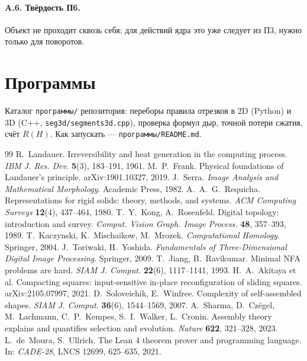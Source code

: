 \documentclass[11pt,a4paper]{article}
\theoremstyle{plain}
\theoremstyle{definition}
\theoremstyle{remark}
\begin{document}
\paragraph{A.6. Твёрдость П6.} Объект не проходит сквозь себя; для действий ядра это уже следует из П3, нужно только для поворотов.

\section{Программы}
Каталог \texttt{программы/} репозитория: переборы правила отрезков в 2D (Python) и 3D (C++, \texttt{seg3d/segments3d.cpp}), проверка формул дыр, точной потери сжатия, счёт $R(H)$. Как запускать — \texttt{программы/README.md}.

\begin{thebibliography}{99}
 R.~Landauer. Irreversibility and heat generation in the computing process. \emph{IBM J. Res. Dev.} \textbf{5}(3), 183--191, 1961.
 M.~P.~Frank. Physical foundations of Landauer's principle. arXiv:1901.10327, 2019.
 J.~Serra. \emph{Image Analysis and Mathematical Morphology}. Academic Press, 1982.
 A.~A.~G.~Requicha. Representations for rigid solids: theory, methods, and systems. \emph{ACM Computing Surveys} \textbf{12}(4), 437--464, 1980.
 T.~Y.~Kong, A.~Rosenfeld. Digital topology: introduction and survey. \emph{Comput. Vision Graph. Image Process.} \textbf{48}, 357--393, 1989.
 T.~Kaczynski, K.~Mischaikow, M.~Mrozek. \emph{Computational Homology}. Springer, 2004.
 J.~Toriwaki, H.~Yoshida. \emph{Fundamentals of Three-Dimensional Digital Image Processing}. Springer, 2009.
 T.~Jiang, B.~Ravikumar. Minimal NFA problems are hard. \emph{SIAM J. Comput.} \textbf{22}(6), 1117--1141, 1993.
 H.~A.~Akitaya et al. Compacting squares: input-sensitive in-place reconfiguration of sliding squares. arXiv:2105.07997, 2021.
 D.~Soloveichik, E.~Winfree. Complexity of self-assembled shapes. \emph{SIAM J. Comput.} \textbf{36}(6), 1544--1569, 2007.
 A.~Sharma, D.~Czégel, M.~Lachmann, C.~P.~Kempes, S.~I.~Walker, L.~Cronin. Assembly theory explains and quantifies selection and evolution. \emph{Nature} \textbf{622}, 321--328, 2023.
 L.~de~Moura, S.~Ullrich. The Lean 4 theorem prover and programming language. In: \emph{CADE-28}, LNCS 12699, 625--635, 2021.
\end{thebibliography}
\end{document}
